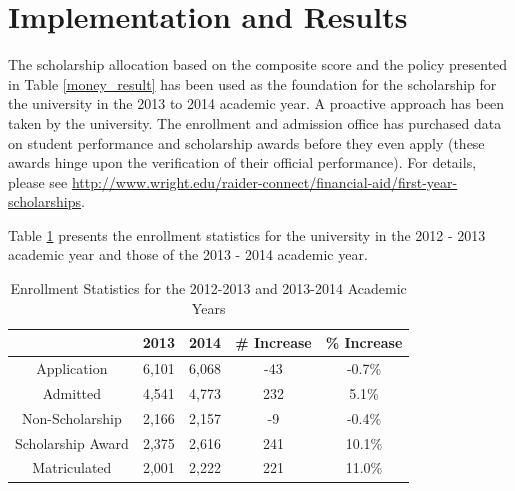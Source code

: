 \documentclass[12pt,english]{report}
\begin{document}
\section{Implementation and Results}
The scholarship allocation based on the composite score and the policy presented in Table \ref{money_result} has been used as the foundation for the scholarship for the university in the 2013 to 2014 academic year.  A proactive approach has been taken by the university. The enrollment and admission office has purchased data on student performance and  scholarship awards before they even apply (these awards hinge upon the verification of their official performance). For details, please see \url{http://www.wright.edu/raider-connect/financial-aid/first-year-scholarships}.


Table \ref{enroll_stats} presents the enrollment statistics for the university in the 2012 - 2013 academic year and those of the 2013 - 2014 academic year. 

\begin{table}[ht!]
\centering
\begin{tabular}{|c|c|c|c|c|}
\hline
                               & 2013 & 2014 & \# Increase & \% Increase \\ \hline
Application                    & 6,101 & 6,068 & -43         & -0.7\%      \\ \hline
Admitted                       & 4,541 & 4,773 & 232         & 5.1\%       \\ \hline
Non-Scholarship                & 2,166 & 2,157 & -9          & -0.4\%      \\ \hline
Scholarship Award              & 2,375 & 2,616 & 241         & 10.1\%      \\ \hline
Matriculated                   & 2,001 & 2,222 & 221         & 11.0\%      \\ \hline
\end{tabular}
\caption{Enrollment Statistics for the 2012-2013 and 2013-2014 Academic Years}
\label{enroll_stats}

\end{table}
\end{document}
